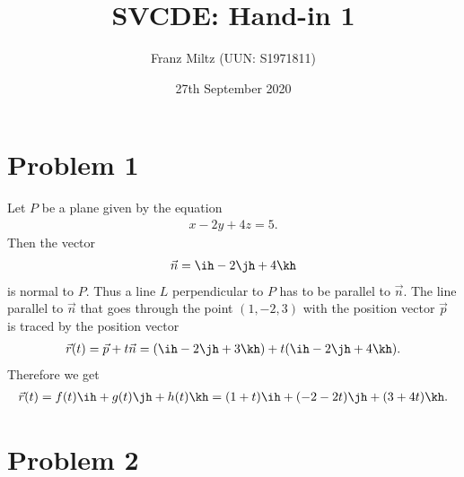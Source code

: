 \documentclass{article}
\begin{document}
\title{SVCDE: Hand-in 1}
\author{Franz Miltz (UUN: S1971811)}
\date{27th September 2020}
\maketitle


\section*{Problem 1}


Let $P$ be a plane given by the equation
\begin{align*}
	x - 2y + 4z = 5.
\end{align*}
Then the vector
\begin{align*}
	\vec n = \ih - 2 \jh + 4 \kh
\end{align*}
is normal to $P$. Thus a line $L$ perpendicular to $P$ has to be
parallel to $\vec n$. The line parallel to $\vec n$ that goes through
the point $(1,-2,3)$ with the position vector $\vec p$ is traced by the position vector
\begin{align*}
	\vec r(t) = \vec p + t \vec n
	= (\ih - 2\jh + 3\kh) + t(\ih - 2\jh + 4\kh).
\end{align*}
Therefore we get
\begin{align*}
	\vec r (t) = f(t)\ih + g(t)\jh + h(t)\kh = (1+t)\ih+(-2-2t)\jh+(3+4t)\kh.
\end{align*}


\section*{Problem 2}
\end{document}
